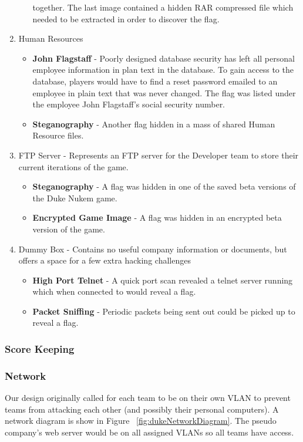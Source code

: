 \documentclass[10pt]{article}
\begin{document}
\begin{enumerate}
\begin{itemize}
        together. The last image contained a hidden RAR compressed file which
        needed to be extracted in order to discover the flag.        
      \end{itemize}
  \item Human Resources
      \begin{itemize}
        \item \textbf{John Flagstaff} - Poorly designed database security has
        left all personal employee information in plan text in the database. To
        gain access to the database, players would have to find a reset password
        emailed to an employee in plain text that was never changed. The flag
        was listed under the employee John Flagstaff's social security number.
        \item \textbf{Steganography} - Another flag hidden in a mass of shared
        Human Resource files.        
      \end{itemize}
  \item FTP Server - Represents an FTP server for the Developer team to store
  their current iterations of the game.
      \begin{itemize}
        \item \textbf{Steganography} - A flag was hidden in one of the saved
        beta versions of the Duke Nukem game.
        \item \textbf{Encrypted Game Image} - A flag was hidden in an encrypted
        beta version of the game.
      \end{itemize}
   \item Dummy Box - Contains no useful company information or documents, but
   offers a space for a few extra hacking challenges
      \begin{itemize}
        \item \textbf{High Port Telnet} - A quick port scan revealed a telnet
        server running which when connected to would reveal a flag.
        \item \textbf{Packet Sniffing} - Periodic packets being sent out could
        be picked up to reveal a flag.
      \end{itemize}
\end{enumerate}

\subsubsection{Score Keeping}

\subsubsection{Network}
Our design originally called for each team to be on their own VLAN to prevent
teams from attacking each other (and possibly their personal computers). A
network diagram is show in Figure ~\ref{fig:dukeNetworkDiagram}. The pseudo
company's web server would be on all assigned VLANs so all teams have access.
\end{document}
